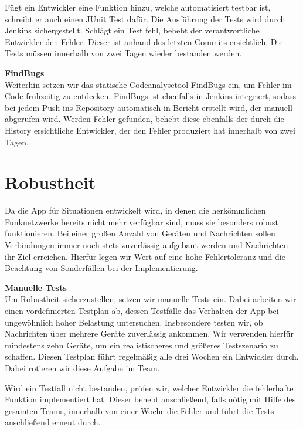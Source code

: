 Fügt ein Entwickler eine Funktion hinzu, welche automatisiert testbar ist, schreibt er auch einen JUnit Test dafür. Die Ausführung der Tests wird durch Jenkins sichergestellt. Schlägt ein Test fehl, behebt der verantwortliche Entwickler den Fehler. Dieser ist anhand des letzten Commits ersichtlich. Die Tests müssen innerhalb von zwei Tagen wieder bestanden werden.
    
\textbf{FindBugs}\\
Weiterhin setzen wir das statische Codeanalysetool FindBugs ein, um Fehler im Code frühzeitig zu entdecken. FindBugs ist ebenfalls in Jenkins integriert, sodass bei jedem Push ins Repository automatisch in Bericht erstellt wird, der manuell abgerufen wird. Werden Fehler gefunden, behebt diese ebenfalls der durch die History ersichtliche Entwickler, der den Fehler produziert hat innerhalb von zwei Tagen.

\section{Robustheit}
Da die App für Situationen entwickelt wird, in denen die herkömmlichen Funknetzwerke bereits nicht mehr verfügbar sind, muss sie besonders robust funktionieren. Bei einer großen Anzahl von Geräten und Nachrichten sollen Verbindungen immer noch stets zuverlässig aufgebaut werden und Nachrichten ihr Ziel erreichen. Hierfür legen wir Wert auf eine hohe Fehlertoleranz und die Beachtung von Sonderfällen bei der Implementierung.
  
\textbf{Manuelle Tests}\\
Um Robustheit sicherzustellen, setzen wir manuelle Tests ein. Dabei arbeiten wir einen vordefinierten Testplan ab, dessen Testfälle das Verhalten der App bei ungewöhnlich hoher Belastung untersuchen. Insbesondere testen wir, ob Nachrichten über mehrere Geräte zuverlässig ankommen. Wir verwenden hierfür mindestens zehn Geräte, um ein realistischeres und größeres Testszenario zu schaffen. Diesen Testplan führt regelmäßig alle drei Wochen ein Entwickler durch. Dabei rotieren wir diese Aufgabe im Team.
    
Wird ein Testfall nicht bestanden, prüfen wir, welcher Entwickler die fehlerhafte Funktion implementiert hat. Dieser behebt anschließend, falls nötig mit Hilfe des gesamten Teams, innerhalb von einer Woche die Fehler und führt die Tests anschließend erneut durch.
